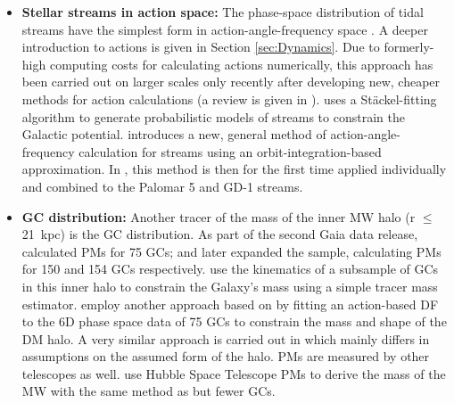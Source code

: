 \begin{itemize}
    \item \textbf{Stellar streams in action space:} The phase-space distribution of tidal streams have the simplest form in action-angle-frequency space \citep{Tremaine...streamsactiontheory...1999, Helmi...streamsactionstheory...1999}. A deeper introduction to actions is given in Section \ref{sec:Dynamics}. Due to formerly-high computing costs for calculating actions numerically, this approach has been carried out on larger scales only recently after developing new, cheaper methods for action calculations (a review is given in \citealp{Sanders...actionreview...2016}). \citet{Streams...Sanders...2014} uses a St\"ackel-fitting algorithm \citep{Sanders...Staeckel...2012} to generate probabilistic models of streams to constrain the Galactic potential. \citet{Streams...Bovy...2014} introduces a new, general method of action-angle-frequency calculation for streams using an orbit-integration-based approximation. In \citet{Streams..GD1..Pal5...Bovy...2016}, this method is then for the first time applied individually and combined to the Palomar 5 and GD-1 streams.
    \item \textbf{\ac{GC} distribution:} Another tracer of the mass of the inner \ac{MW} halo (r $\le$ \SI{21}{kpc}) is the \ac{GC} distribution. As part of the second Gaia data release, \citet{GaiaDR...GCs...2018} calculated \acp{PM} for 75 \acp{GC}; \citet{Vasiliev...GCoverview...2018} and \citet{Baumgardt...GCoverview...2019} later expanded the sample, calculating \acp{PM} for 150 and 154 \acp{GC} respectively. \citet{MWmass...GCmotions...Watkins...2018} use the kinematics of a subsample of \acp{GC} in this inner halo to constrain the Galaxy's mass using a simple tracer mass estimator. \citet{Posti...MWmassGCs...2018} employ another approach based on \citet{Binney...MWGCModel....2017} by fitting an action-based \ac{DF} to the 6D phase space data of 75 \acp{GC} to constrain the mass and shape of the \ac{DM} halo. A very similar approach is carried out in \citet{Vasiliev...GCoverview...2018} which mainly differs in assumptions on the assumed form of the halo. \acp{PM} are measured by other telescopes as well. \citet{Sohn...GCsHST..2018} use Hubble Space Telescope \acp{PM} to derive the mass of the \ac{MW} with the same method as \citet{MWmass...GCmotions...Watkins...2018} but fewer \acp{GC}. 

\end{itemize}
